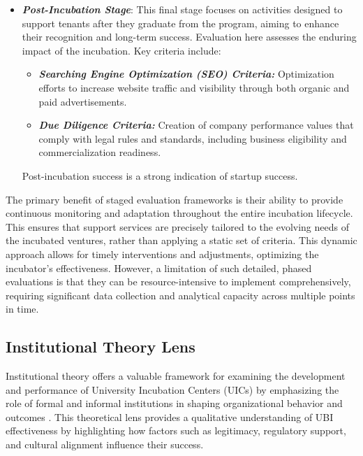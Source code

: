 \documentclass[../Main.tex]{subfiles}
\begin{document}
\begin{itemize}
    \item \emph{\textbf{Post-Incubation Stage}}: This final stage focuses on activities designed to support tenants after they graduate from the program, aiming to enhance their recognition and long-term success. Evaluation here assesses the enduring impact of the incubation. Key criteria include:
          \begin{itemize}
              \item \emph{\textbf{Searching Engine Optimization (SEO) Criteria:}} Optimization efforts to increase website traffic and visibility through both organic and paid advertisements.
              \item \emph{\textbf{Due Diligence Criteria:}} Creation of company performance values that comply with legal rules and standards, including business eligibility and commercialization readiness.
          \end{itemize}
          Post-incubation success is a strong indication of startup success.
\end{itemize}

The primary benefit of staged evaluation frameworks is their ability to provide continuous monitoring and adaptation throughout the entire incubation lifecycle. This ensures that support services are precisely tailored to the evolving needs of the incubated ventures, rather than applying a static set of criteria. This dynamic approach allows for timely interventions and adjustments, optimizing the incubator's effectiveness. However, a limitation of such detailed, phased evaluations is that they can be resource-intensive to implement comprehensively, requiring significant data collection and analytical capacity across multiple points in time.

\subsection{Institutional Theory Lens}

Institutional theory offers a valuable framework for examining the development and performance of University Incubation Centers (UICs) by emphasizing the role of formal and informal institutions in shaping organizational behavior and outcomes \cite{Kulkarni2024University}. This theoretical lens provides a qualitative understanding of UBI effectiveness by highlighting how factors such as legitimacy, regulatory support, and cultural alignment influence their success.
\end{document}
